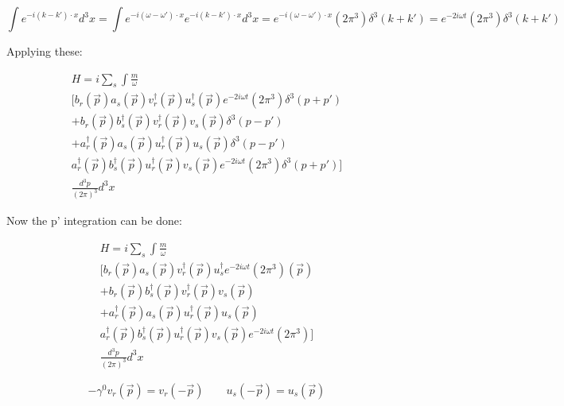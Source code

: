 \documentclass[a4]{article}
\begin{document}
    \begin{equation}
        \int e^{-i (k-k') \cdot x} d^3 x = \int e^{-i (\omega-\omega') \cdot x} e^{-i (k-k') \cdot x} d^3 x = e^{-i (\omega-\omega') \cdot x} (2 \pi^3) \delta^3 (k + k') = e^{-2i \omega t} (2 \pi^3) \delta^3 (k + k')
    \end{equation}

    Applying these:

    \begin{equation}
        \begin{aligned}
            H = i \sum_{s} \int \frac{m}{\omega} \\
        [b_r (\vec{p}) a_s (\vec{p}) v_r^{\dagger} (\vec{p}) u_s^{\dagger} (\vec{p}) e^{-2i \omega t} (2 \pi^3) \delta^3 (p + p') \\
        + b_r (\vec{p}) b_s^{\dagger} (\vec{p}) v_r^{\dagger} (\vec{p}) v_s (\vec{p}) \delta^3 (p - p') \\
        + a_r^{\dagger} (\vec{p}) a_s (\vec{p}) u_r^{\dagger} (\vec{p}) u_s (\vec{p}) \delta^3 (p - p') \\
        a_r^{\dagger} (\vec{p}) b_s^{\dagger} (\vec{p}) u_r^{\dagger} (\vec{p}) v_s (\vec{p}) e^{-2i \omega t} (2 \pi^3) \delta^3 (p + p')] \\
        \frac{d^{3} p}{(2 \pi)^3} d^3 x
        \end{aligned}
    \end{equation}

    Now the p' integration can be done:

    \begin{equation}
        \begin{aligned}
            H = i \sum_{s} \int \frac{m}{\omega} \\
        [b_r (\vec{p}) a_s (\vec{p}) v_r^{\dagger} (\vec{p}) u_s^{\dagger} e^{-2i \omega t} (2 \pi^3) (\vec{p}) \\
        + b_r (\vec{p}) b_s^{\dagger} (\vec{p}) v_r^{\dagger} (\vec{p}) v_s (\vec{p}) \\
        + a_r^{\dagger} (\vec{p}) a_s (\vec{p}) u_r^{\dagger} (\vec{p}) u_s (\vec{p}) \\
        a_r^{\dagger} (\vec{p}) b_s^{\dagger} (\vec{p}) u_r^{\dagger} (\vec{p}) v_s (\vec{p}) e^{-2i \omega t} (2 \pi^3)] \\
        \frac{d^{3} p}{(2 \pi)^3} d^3 x
        \end{aligned}
    \end{equation}

    \begin{equation}
        - \gamma^0 v_r (\vec{p}) = v_r (- \vec{p}) \qquad u_s (- \vec{p}) = u_s (\vec{p})
    \end{equation}
\end{document}
